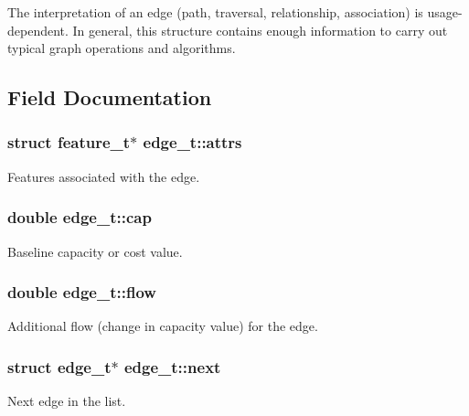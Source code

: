 The interpretation of an edge (path, traversal, relationship, association) is usage-\/dependent. In general, this structure contains enough information to carry out typical graph operations and algorithms. 

\subsection{Field Documentation}
\subsubsection[{\texorpdfstring{attrs}{attrs}}]{\setlength{\rightskip}{0pt plus 5cm}struct {\bf feature\+\_\+t}$\ast$ edge\+\_\+t\+::attrs}\hypertarget{structedge__t_afef8b0abae38e565a0c21a3f9c863870}{}\label{structedge__t_afef8b0abae38e565a0c21a3f9c863870}
Features associated with the edge. 
\subsubsection[{\texorpdfstring{cap}{cap}}]{\setlength{\rightskip}{0pt plus 5cm}double edge\+\_\+t\+::cap}\hypertarget{structedge__t_a008f610ba47f30e49b6350e4bb00d6aa}{}\label{structedge__t_a008f610ba47f30e49b6350e4bb00d6aa}
Baseline capacity or cost value. 
\subsubsection[{\texorpdfstring{flow}{flow}}]{\setlength{\rightskip}{0pt plus 5cm}double edge\+\_\+t\+::flow}\hypertarget{structedge__t_a45d88baf5d0fa8abd4b512e6856b9b2d}{}\label{structedge__t_a45d88baf5d0fa8abd4b512e6856b9b2d}
Additional flow (change in capacity value) for the edge. 
\subsubsection[{\texorpdfstring{next}{next}}]{\setlength{\rightskip}{0pt plus 5cm}struct {\bf edge\+\_\+t}$\ast$ edge\+\_\+t\+::next}\hypertarget{structedge__t_a1e36360af59a1ec80463b82e00362480}{}\label{structedge__t_a1e36360af59a1ec80463b82e00362480}


Next edge in the list. 

